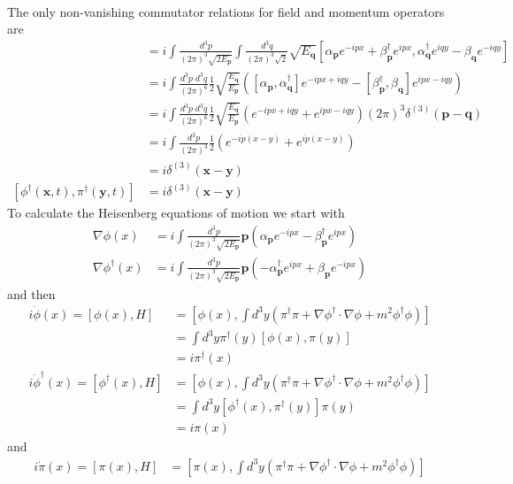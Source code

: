 \documentclass[../main.tex]{subfiles}
\begin{document}
\begin{enumerate}[(a)]
\begin{align}
\end{align}
The only non-vanishing commutator relations for field and momentum operators are
\begin{align}
[\phi(\mathbf{x},t),\pi(\mathbf{y},t)]&=i\int\frac{d^3p}{(2\pi)^3\sqrt{2E_\mathbf{p}}}\int\frac{d^3q}{(2\pi)^3\sqrt{2}}\sqrt{E_\mathbf{q}}[\alpha_\mathbf{p}e^{-ipx}+\beta^\dagger_\mathbf{p} e^{ipx},\alpha^\dagger_\mathbf{q}e^{iqy}-\beta_\mathbf{q} e^{-iqy}]\\
&=i\int\frac{d^3p\;d^3q}{(2\pi)^6}\frac{1}{2}\sqrt{\frac{E_\mathbf{q}}{E_\mathbf{p}}}([\alpha_\mathbf{p},\alpha^\dagger_\mathbf{q}]e^{-ipx+iqy}-[\beta^\dagger_\mathbf{p},\beta_\mathbf{q}]e^{ipx-iqy})\\
&=i\int\frac{d^3p\;d^3q}{(2\pi)^6}\frac{1}{2}\sqrt{\frac{E_\mathbf{q}}{E_\mathbf{p}}}(e^{-ipx+iqy}+e^{ipx-iqy})(2\pi)^3\delta^{(3)}(\mathbf{p}-\mathbf{q})\\
&=i\int\frac{d^3p}{(2\pi)^3}\frac{1}{2}(e^{-ip(x-y)}+e^{ip(x-y)})\\
&=i\delta^{(3)}(\mathbf{x}-\mathbf{y})\\
[\phi^\dagger(\mathbf{x},t),\pi^\dagger(\mathbf{y},t)]
&=i\delta^{(3)}(\mathbf{x}-\mathbf{y})
\end{align}
To calculate the Heisenberg equations of motion we start with
\begin{align}
\nabla\phi(x)
&=i\int\frac{d^3p}{(2\pi)^3\sqrt{2E_\mathbf{p}}}\mathbf{p}\left(\alpha_\mathbf{p}e^{-ipx}-\beta^\dagger_\mathbf{p} e^{ipx}\right)\\
\nabla\phi^\dagger(x)
&=i\int\frac{d^3p}{(2\pi)^3\sqrt{2E_\mathbf{p}}}\mathbf{p}\left(-\alpha^\dagger_\mathbf{p}e^{ipx}+\beta_\mathbf{p}e^{-ipx}\right)
\end{align}
and then
\begin{align}
i\dot{\phi}(x)=[\phi(x),H]
&=\left[\phi(x),\int d^3y(\pi^\dagger\pi+\nabla\phi^\dagger\cdot\nabla\phi+m^2\phi^\dagger\phi)\right]\\
&=\int d^3y\pi^\dagger(y)[\phi(x),\pi(y)]\\
&=i\pi^\dagger(x)\\
i\dot{\phi}^\dagger(x)=[\phi^\dagger(x),H]
&=\left[\phi(x),\int d^3y(\pi^\dagger\pi+\nabla\phi^\dagger\cdot\nabla\phi+m^2\phi^\dagger\phi)\right]\\
&=\int d^3y[\phi^\dagger(x),\pi^\dagger(y)]\pi(y)\\
&=i\pi(x)
\end{align}
and 
\begin{align}
i\dot{\pi}(x)=[\pi(x),H]
&=\left[\pi(x),\int d^3y(\pi^\dagger\pi+\nabla\phi^\dagger\cdot\nabla\phi+m^2\phi^\dagger\phi)\right]\\

\end{align}
\end{enumerate}
\end{document}
